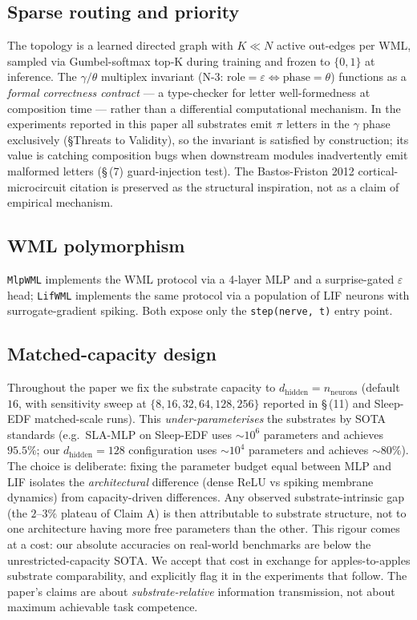 \documentclass[10pt,twocolumn]{article}
\begin{document}
\subsection{Sparse routing and priority}
The topology is a learned directed graph with $K \ll N$ active
out-edges per WML, sampled via Gumbel-softmax top-K during training
and frozen to $\{0, 1\}$ at inference. The $\gamma / \theta$ multiplex
invariant (N-3: $\text{role}{=}\varepsilon \Leftrightarrow
\text{phase}{=}\theta$) functions as a \emph{formal correctness
contract} --- a type-checker for letter well-formedness at
composition time --- rather than a differential computational
mechanism. In the experiments reported in this paper all substrates
emit $\pi$ letters in the $\gamma$ phase exclusively (\S Threats to
Validity), so the invariant is satisfied by construction; its value
is catching composition bugs when downstream modules inadvertently
emit malformed letters (\S\,(7) guard-injection test). The
Bastos-Friston 2012 cortical-microcircuit citation is preserved as
the structural inspiration, not as a claim of empirical mechanism.

\subsection{WML polymorphism}
\texttt{MlpWML} implements the WML protocol via a 4-layer MLP and
a surprise-gated $\varepsilon$ head; \texttt{LifWML} implements the
same protocol via a population of LIF neurons with surrogate-gradient
spiking. Both expose only the \texttt{step(nerve, t)} entry point.

\subsection{Matched-capacity design}
\label{sec:matched-capacity}
Throughout the paper we fix the substrate capacity to
$d_{\mathrm{hidden}} = n_{\mathrm{neurons}}$ (default $16$, with
sensitivity sweep at $\{8, 16, 32, 64, 128, 256\}$ reported in
\S\,(11) and Sleep-EDF matched-scale runs). This \emph{under-parameterises}
the substrates by SOTA standards (e.g.\ SLA-MLP on Sleep-EDF uses
$\sim 10^6$ parameters and achieves $95.5\%$; our $d_{\mathrm{hidden}}
= 128$ configuration uses $\sim 10^4$ parameters and achieves
$\sim 80\%$). The choice is deliberate: fixing the parameter budget
equal between MLP and LIF isolates the \emph{architectural} difference
(dense ReLU vs spiking membrane dynamics) from capacity-driven
differences. Any observed substrate-intrinsic gap (the $2$--$3\%$
plateau of Claim A) is then attributable to substrate structure, not
to one architecture having more free parameters than the other. This
rigour comes at a cost: our absolute accuracies on real-world
benchmarks are below the unrestricted-capacity SOTA. We accept that
cost in exchange for apples-to-apples substrate comparability, and
explicitly flag it in the experiments that follow. The paper's claims
are about \emph{substrate-relative} information transmission, not
about maximum achievable task competence.
\end{document}
